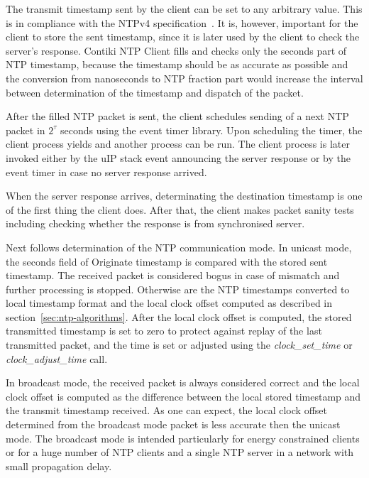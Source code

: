 

The transmit timestamp sent by the client can be set to any arbitrary value.
This is in compliance with the NTPv4 specification~\cite{rfc5905}.
It is, however, important for the client to store the sent timestamp,
since it is later used by the client to check the server's response.
Contiki NTP Client fills and checks only the seconds part of NTP timestamp,
because the timestamp should be as accurate as possible and the
conversion from nanoseconds to NTP fraction part would increase the interval
between determination of the timestamp and dispatch of the packet.

After the filled NTP packet is sent, the client schedules
sending of a next NTP packet in $2^{\tau}$ seconds
using the event timer library.
Upon scheduling the timer, the client process yields
and another process can be run.
The client process is later invoked either by the uIP stack event
announcing the server response
or by the event timer in case no server response arrived.

When the server response arrives,
determinating the destination timestamp is one of the first thing the client does.
After that, the client makes packet sanity tests including
checking whether the response is from synchronised server.

Next follows determination of the NTP communication mode.
In unicast mode, the seconds field of Originate timestamp
is compared with the stored sent timestamp.
The received packet is considered bogus in case of mismatch and further processing is stopped.
Otherwise are the NTP timestamps converted to local timestamp format and
the local clock offset computed as described in section~\ref{sec:ntp-algorithms}.
After the local clock offset is computed,
the stored transmitted timestamp is set to zero
to protect against replay of the last transmitted packet,
and the time is set or adjusted using the {\it{clock_set_time}}
or {\it{clock_adjust_time}} call.

In broadcast mode, the received packet is always considered correct
and the local clock offset is computed as the difference between the local stored timestamp
and the transmit timestamp received.
As one can expect, the local clock offset determined from the broadcast mode packet
is less accurate then the unicast mode.
The broadcast mode is intended particularly for energy constrained clients
or for a huge number of NTP clients and a single NTP server
in a network with small propagation delay.

